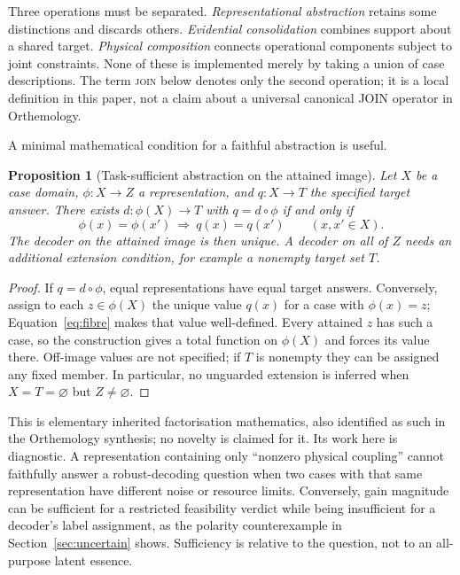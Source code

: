\documentclass[11pt,a4paper]{article}
\newtheorem{proposition}[theorem]{Proposition}
\theoremstyle{definition}
\theoremstyle{remark}
\begin{document}
Three operations must be separated. \emph{Representational abstraction} retains some distinctions and discards others. \emph{Evidential consolidation} combines support about a shared target. \emph{Physical composition} connects operational components subject to joint constraints. None of these is implemented merely by taking a union of case descriptions. The term \textsc{join} below denotes only the second operation; it is a local definition in this paper, not a claim about a universal canonical JOIN operator in Orthemology.

A minimal mathematical condition for a faithful abstraction is useful.
\begin{proposition}[Task-sufficient abstraction on the attained image]\label{prop:fibre}
Let $X$ be a case domain, $\phi:X\to Z$ a representation, and $q:X\to T$ the specified target answer. There exists $d:\phi(X)\to T$ with $q=d\circ\phi$ if and only if
\begin{equation}\label{eq:fibre}
 \phi(x)=\phi(x')\ \Longrightarrow\ q(x)=q(x')\qquad(x,x'\in X).
\end{equation}
The decoder on the attained image is then unique. A decoder on all of $Z$ needs an additional extension condition, for example a nonempty target set $T$.
\end{proposition}
\begin{proof}
If $q=d\circ\phi$, equal representations have equal target answers. Conversely, assign to each $z\in\phi(X)$ the unique value $q(x)$ for a case with $\phi(x)=z$; Equation~\eqref{eq:fibre} makes that value well-defined. Every attained $z$ has such a case, so the construction gives a total function on $\phi(X)$ and forces its value there. Off-image values are not specified; if $T$ is nonempty they can be assigned any fixed member. In particular, no unguarded extension is inferred when $X=T=\varnothing$ but $Z\ne\varnothing$.
\end{proof}

This is elementary inherited factorisation mathematics, also identified as such in the Orthemology synthesis; no novelty is claimed for it. Its work here is diagnostic. A representation containing only ``nonzero physical coupling'' cannot faithfully answer a robust-decoding question when two cases with that same representation have different noise or resource limits. Conversely, gain magnitude can be sufficient for a restricted feasibility verdict while being insufficient for a decoder's label assignment, as the polarity counterexample in Section~\ref{sec:uncertain} shows. Sufficiency is relative to the question, not to an all-purpose latent essence.
\end{document}
